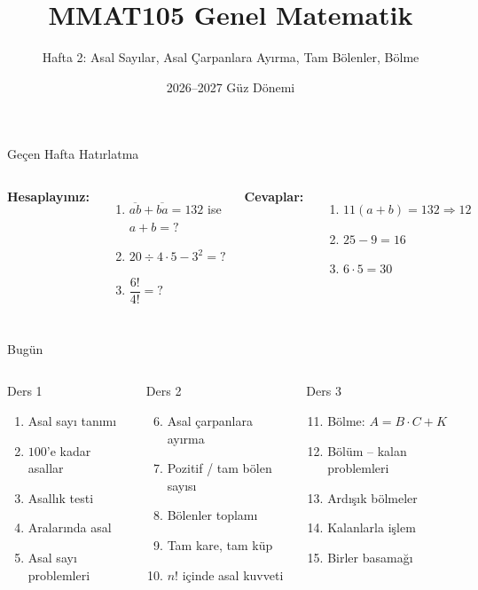 \documentclass[aspectratio=169,11pt,handout]{beamer}
\title[MMAT105 -- Hafta 2]{MMAT105 Genel Matematik}
\subtitle{Hafta 2: Asal Sayılar, Asal Çarpanlara Ayırma, Tam Bölenler, Bölme}
\author{}
\date{2026--2027 Güz Dönemi}
\newcommand{\ab}[1]{\overline{#1}}
\begin{document}
\begin{frame}
\titlepage
\end{frame}


\begin{frame}{Geçen Hafta Hatırlatma}
\begin{columns}[t]
\textbf{Hesaplayınız:}
\begin{enumerate}
\item \(\ab{ab}+\ab{ba}=132\) ise \(a+b=?\)
\item \(20\div 4\cdot 5-3^2=?\)
\item \(\dfrac{6!}{4!}=?\)
\end{enumerate}
\pause
\textbf{Cevaplar:}
\begin{enumerate}
\item \(11(a+b)=132\Rightarrow 12\)
\item \(25-9=16\)
\item \(6\cdot 5=30\)
\end{enumerate}
\end{columns}
\end{frame}

\begin{frame}{Bugün}
\begin{columns}[t]
\begin{block}{Ders 1}
\begin{enumerate}
\item Asal sayı tanımı
\item \(100\)'e kadar asallar
\item Asallık testi
\item Aralarında asal
\item Asal sayı problemleri
\end{enumerate}
\end{block}
\begin{block}{Ders 2}
\begin{enumerate}\setcounter{enumi}{5}
\item Asal çarpanlara ayırma
\item Pozitif / tam bölen sayısı
\item Bölenler toplamı
\item Tam kare, tam küp
\item \(n!\) içinde asal kuvveti
\end{enumerate}
\end{block}
\begin{block}{Ders 3}
\begin{enumerate}\setcounter{enumi}{10}
\item Bölme: \(A=B\cdot C+K\)
\item Bölüm -- kalan problemleri
\item Ardışık bölmeler
\item Kalanlarla işlem
\item Birler basamağı
\end{enumerate}
\end{block}
\end{columns}
\end{frame}
\end{document}
